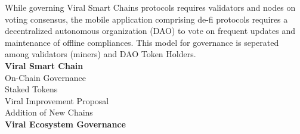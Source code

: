 \documentclass[conference]{IEEEtran}
\begin{document}
While governing Viral Smart Chains protocols requires validators and nodes on voting consensus, the mobile application comprising de-fi protocols requires a decentralized autonomous organization (DAO) to vote on frequent updates and maintenance of offline compliances. This model for governance is seperated among validators (miners) and DAO Token Holders.\\


\textbf{Viral Smart Chain}\\

On-Chain Governance\\
Staked Tokens\\
Viral Improvement Proposal\\
Addition of New Chains\\

\textbf{Viral Ecosystem Governance}\\
\end{document}
